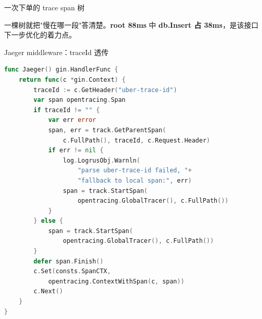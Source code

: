 \documentclass[aspectratio=169,11pt]{beamer}
\begin{document}
\begin{frame}[shrink]{一次下单的 trace span 树}
\vspace{1mm}
\small 一棵树就把"慢在哪一段"答清楚。\textbf{root 88ms} 中 \textbf{db.Insert 占 38ms}，是该接口下一步优化的着力点。
\end{frame}

\begin{frame}{Jaeger middleware：traceId 透传}
\begin{lstlisting}[language=Go,firstnumber=12,
  caption={}]
func Jaeger() gin.HandlerFunc {
    return func(c *gin.Context) {
        traceId := c.GetHeader("uber-trace-id")
        var span opentracing.Span
        if traceId != "" {
            var err error
            span, err = track.GetParentSpan(
                c.FullPath(), traceId, c.Request.Header)
            if err != nil {
                log.LogrusObj.Warnln(
                    "parse uber-trace-id failed, "+
                    "fallback to local span:", err)
                span = track.StartSpan(
                    opentracing.GlobalTracer(), c.FullPath())
            }
        } else {
            span = track.StartSpan(
                opentracing.GlobalTracer(), c.FullPath())
        }
        defer span.Finish()
        c.Set(consts.SpanCTX,
            opentracing.ContextWithSpan(c, span))
        c.Next()
    }
}
\end{lstlisting}
\end{frame}
\end{document}
